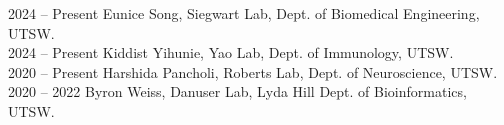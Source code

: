 2024 -- Present \hspace{14pt} Eunice Song, Siegwart Lab, Dept. of Biomedical Engineering, UTSW. \\
2024 -- Present \hspace{14pt} Kiddist Yihunie, Yao Lab, Dept. of Immunology, UTSW. \\
2020 -- Present \hspace{14pt} Harshida Pancholi, Roberts Lab, Dept. of Neuroscience, UTSW. \\
2020 -- 2022 \hspace{28pt} Byron Weiss, Danuser Lab, Lyda Hill Dept. of Bioinformatics, UTSW. \\
